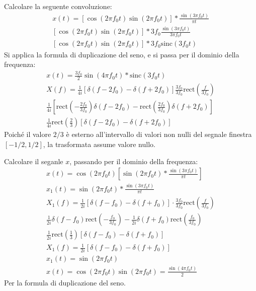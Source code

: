 \documentclass{article}
\numberwithin{equation}{subsection}
\begin{document}
Calcolare la seguente convoluzione:
\begin{gather*}
    x(t)=\left[\cos(2\pi f_0t)\sin(2\pi f_0t)\right]*\displaystyle\frac{\sin(3\pi f_0t)}{\pi t}\\
    \left[\cos(2\pi f_0t)\sin(2\pi f_0t)\right]*\displaystyle3f_0\frac{\sin(3\pi f_0t)}{3\pi f_0t}\\
    \left[\cos(2\pi f_0t)\sin(2\pi f_0t)\right]*3f_0\mbox{sinc}(3f_0 t)
\end{gather*}
Si applica la formula di duplicazione del seno, e si passa per il dominio della frequenza:
\begin{gather*}
    x(t)=\displaystyle\frac{3f_0}{2}\sin(4\pi f_0t)*\mbox{sinc}(3f_0t)\\
    X(f)=\displaystyle\frac{1}{4i}\left[\delta(f-2f_0)-\delta(f+2f_0)\right]\frac{3f_0}{3f_0}\mbox{rect}\left(\frac{f}{3f_0}\right)\\
    \displaystyle\frac{1}{4i}\left[\mbox{rect}\left(-\frac{2f_0}{3f_0}\right)\delta(f-2f_0)-\mbox{rect}\left(\frac{2f_0}{3f_0}\right)\delta(f+2f_0)\right]\\
    \displaystyle\frac{1}{4i}\mbox{rect}\left(\frac{2}{3}\right)\left[\delta(f-2f_0)-\delta(f+2f_0)\right]
\end{gather*}
Poiché il valore $2/3$ è esterno all'intervallo di valori non nulli del segnale finestra $[-1/2,1/2]$, la trasformata assume valore nullo. 


Calcolare il seganle $x$, passando per il dominio della frequenza:
\begin{gather*}
    x(t)=\cos(2\pi f_0t)\left[\sin(2\pi f_0t)*\displaystyle\frac{\sin(3\pi f_0t)}{\pi t}\right]\\
    x_1(t)=\sin(2\pi f_0t)*\displaystyle\frac{\sin(3\pi f_0t)}{\pi t}\\
    X_1(f)=\displaystyle\frac{1}{2i}\left[\delta(f-f_0)-\delta(f+f_0)\right]\cdot \frac{3f_0}{3f_0}\mbox{rect}\left(\frac{f}{3f_0}\right)\\
    \displaystyle\frac{1}{2i}\delta(f-f_0)\mbox{rect}\left(-\frac{f_0}{3f_0}\right)-\frac{1}{2i}\delta(f+f_0)\mbox{rect}\left(\frac{f_0}{3f_0}\right)\\
    \displaystyle\frac{1}{2i}\mbox{rect}\left(\frac{1}{3}\right)\left[\delta(f-f_0)-\delta(f+f_0)\right]\\
    X_1(f)=\displaystyle\frac{1}{2i}\left[\delta(f-f_0)-\delta(f+f_0)\right]\\
    x_1(t)=\sin(2\pi f_0t)\\
    x(t)=\cos(2\pi f_0t)\sin(2\pi f_0t)=\displaystyle\frac{\sin(4\pi f_0t)}{2}
\end{gather*}
Per la formula di duplicazione del seno. 
\end{document}
